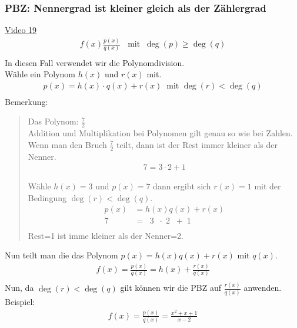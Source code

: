 \subsubsection{PBZ: Nennergrad ist kleiner gleich als der Zählergrad }
\href{https://youtu.be/ovgTWyr47GY}{Video 19}\\
\begin{align*}
f(x)\frac{p(x)}{q(x)}\;\;\text{ mit}\;\;\deg(p)\geq \deg (q)\\
\end{align*}
In diesen Fall verwendet wir die Polynomdivision.\\
Wähle ein Polynom $ h(x) $ und $ r(x) $ mit.\\
\begin{align*}
p(x)=h(x)\cdot q(x)+r(x)\;\;\text{mit } \deg(r)<\deg(q)\\
\end{align*}
\newpage
\noindent
Bemerkung:\\
\begin{quote}
	

Das Polynom: $ \frac{7}{2} $\\
Addition und Multiplikation bei Polynomen gilt genau so wie bei Zahlen.\\
Wenn man den Bruch $ \frac{7}{2} $ teilt, dann ist der Rest immer kleiner als der Nenner.\\
\begin{align*}
7=3\cdot 2+1
\end{align*}

 Wähle $h(x)=3  $ und $ p(x)=7 $ dann ergibt sich $ r(x)=1 $ mit der Bedingung $\deg(r)<\deg(q)  $.\\
\begin{align*}
p(x)&=h(x)q(x)+r(x)\\
7&=\;\;3\;\;\cdot\; 2 \;\;+\;1\\
\end{align*}
Rest=1 ist imme kleiner als der Nenner=2.
\end{quote}
Nun teilt man die das Polynom $ p(x)=h(x)q(x)+r(x) $ mit $ q(x) $.\\
\begin{align*}
f(x)=\frac{p(x)}{q(x)}=h(x)+\frac{r(x)}{q(x)}\\
\end{align*}
Nun, da $ \deg(r)<\deg(q) $ gilt können wir die PBZ auf $ \frac{r(x)}{q(x)}$ anwenden.\vspace*{2mm}\\
Beispiel:\\
\begin{align*}
f(x)=\frac{p(x)}{q(x)}=\frac{x^2+x+1}{x-2}\\
\end{align*}
